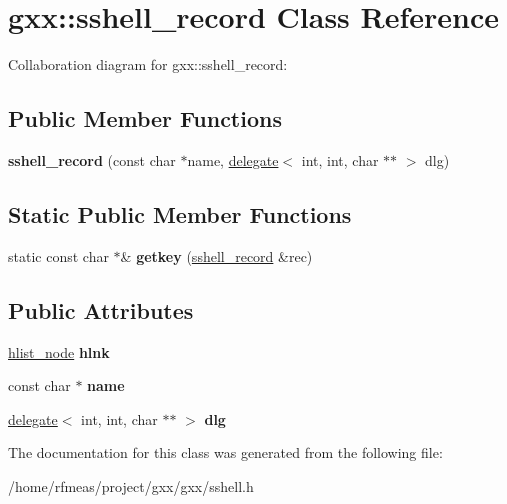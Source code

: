 \hypertarget{classgxx_1_1sshell__record}{}\section{gxx\+:\+:sshell\+\_\+record Class Reference}
\label{classgxx_1_1sshell__record}


Collaboration diagram for gxx\+:\+:sshell\+\_\+record\+:
\subsection*{Public Member Functions}
\begin{DoxyCompactItemize}
\item 
{\bfseries sshell\+\_\+record} (const char $\ast$name, \hyperlink{classgxx_1_1delegate}{delegate}$<$ int, int, char $\ast$$\ast$ $>$ dlg)\hypertarget{classgxx_1_1sshell__record_a8d33f2069f20e8ded1e5581f3b7eb8af}{}\label{classgxx_1_1sshell__record_a8d33f2069f20e8ded1e5581f3b7eb8af}

\end{DoxyCompactItemize}
\subsection*{Static Public Member Functions}
\begin{DoxyCompactItemize}
\item 
static const char $\ast$\& {\bfseries getkey} (\hyperlink{classgxx_1_1sshell__record}{sshell\+\_\+record} \&rec)\hypertarget{classgxx_1_1sshell__record_a3729dfb700a5903b26ae6a3c98d46742}{}\label{classgxx_1_1sshell__record_a3729dfb700a5903b26ae6a3c98d46742}

\end{DoxyCompactItemize}
\subsection*{Public Attributes}
\begin{DoxyCompactItemize}
\item 
\hyperlink{structhlist__node}{hlist\+\_\+node} {\bfseries hlnk}\hypertarget{classgxx_1_1sshell__record_a5d8593f84349192f6f0c349b37f78d0d}{}\label{classgxx_1_1sshell__record_a5d8593f84349192f6f0c349b37f78d0d}

\item 
const char $\ast$ {\bfseries name}\hypertarget{classgxx_1_1sshell__record_a821691a7d0fe3e127dd207d32d3705dd}{}\label{classgxx_1_1sshell__record_a821691a7d0fe3e127dd207d32d3705dd}

\item 
\hyperlink{classgxx_1_1delegate}{delegate}$<$ int, int, char $\ast$$\ast$ $>$ {\bfseries dlg}\hypertarget{classgxx_1_1sshell__record_a0bf2b4e5e06e611e1fc8b540262fc193}{}\label{classgxx_1_1sshell__record_a0bf2b4e5e06e611e1fc8b540262fc193}

\end{DoxyCompactItemize}


The documentation for this class was generated from the following file\+:\begin{DoxyCompactItemize}
\item 
/home/rfmeas/project/gxx/gxx/sshell.\+h\end{DoxyCompactItemize}

